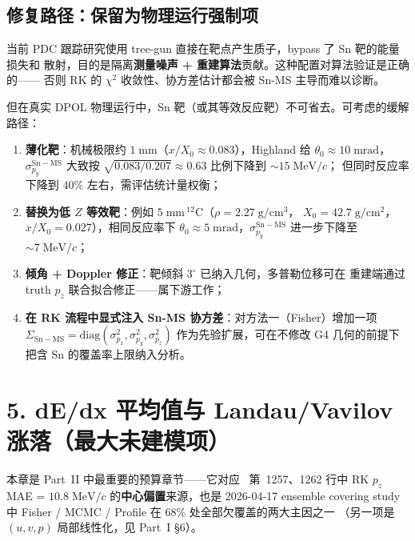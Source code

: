 \subsection{修复路径：保留为物理运行强制项}
\label{sec:budget-sn-ms-fix}

当前 PDC 跟踪研究使用 tree-gun 直接在靶点产生质子，bypass 了 Sn 靶的能量损失和
散射，目的是隔离\textbf{测量噪声 + 重建算法}贡献。这种配置对算法验证是正确的——
否则 RK 的 $\chi^2$ 收敛性、协方差估计都会被 Sn-MS 主导而难以诊断。

但在真实 DPOL 物理运行中，Sn 靶（或其等效反应靶）不可省去。可考虑的缓解路径：
\begin{enumerate}
  \item \textbf{薄化靶}：机械极限约 $1\;\mathrm{mm}$（$x/X_0 \approx 0.083$），Highland
        给 $\theta_0 \approx 10\;\mathrm{mrad}$，$\sigma_{p_y}^{\mathrm{Sn-MS}}$ 大致按
        $\sqrt{0.083/0.207} \approx 0.63$ 比例下降到 $\sim 15\;\mathrm{MeV}/c$；
        但同时反应率下降到 $40\%$ 左右，需评估统计量权衡；
  \item \textbf{替换为低 $Z$ 等效靶}：例如 $5\;\mathrm{mm}\,^{12}\mathrm{C}$（$\rho=2.27\;\mathrm{g/cm^3}$，
        $X_0 = 42.7\;\mathrm{g/cm^2}$，$x/X_0 = 0.027$），相同反应率下
        $\theta_0 \approx 5\;\mathrm{mrad}$，$\sigma_{p_y}^{\mathrm{Sn-MS}}$ 进一步下降至
        $\sim 7\;\mathrm{MeV}/c$；
  \item \textbf{倾角 + Doppler 修正}：靶倾斜 $3^\circ$ 已纳入几何，多普勒位移可在
        重建端通过 truth $p_z$ 联合拟合修正——属下游工作；
  \item \textbf{在 RK 流程中显式注入 Sn-MS 协方差}：对方法一（Fisher）增加一项
        $\Sigma_\mathrm{Sn-MS} = \mathrm{diag}(\sigma_{p_x}^2, \sigma_{p_y}^2, \sigma_{p_z}^2)$
        作为先验扩展，可在不修改 G4 几何的前提下把含 Sn 的覆盖率上限纳入分析。
\end{enumerate}


\section{5. dE/dx 平均值与 Landau/Vavilov 涨落（最大未建模项）}
\label{sec:budget-dedx}

本章是 Part~II 中最重要的预算章节——它对应 \StatusReport{}~第~1257、1262 行中 RK
$p_z$ MAE = $10.8\;\mathrm{MeV}/c$ 的\textbf{中心偏置}来源，也是 2026-04-17 ensemble
covering study 中 Fisher / MCMC / Profile 在 68\% 处全部欠覆盖的两大主因之一
（另一项是 $(u,v,p)$ 局部线性化，见 Part~I §6）。

